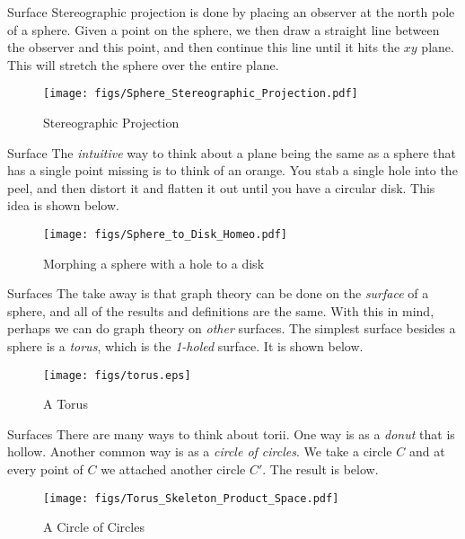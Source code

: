 \documentclass{beamer}
\begin{document}
    \begin{frame}{Surface}
        Stereographic projection is done by placing an observer at the north pole of a sphere.
        Given a point on the sphere, we then draw a straight line between the observer and
        this point, and then continue this line until it hits the $xy$ plane. This will stretch
        the sphere over the entire plane.
        \begin{figure}
            \centering
            \texttt{[image: figs/Sphere\_Stereographic\_Projection.pdf]}
            \caption{Stereographic Projection}
            \label{fig:stereo_proj}
        \end{figure}
    \end{frame}
    \begin{frame}{Surface}
        The \textit{intuitive} way to think about a plane being the same as a sphere that has a
        single point missing is to think of an orange. You stab a single hole into the peel, and
        then distort it and flatten it out until you have a circular disk. This idea is shown
        below.
        \begin{figure}
            \centering
            \texttt{[image: figs/Sphere\_to\_Disk\_Homeo.pdf]}
            \caption{Morphing a sphere with a hole to a disk}
            \label{fig:sphere_to_disk}
        \end{figure}
    \end{frame}
    \begin{frame}{Surfaces}
        The take away is that graph theory can be done on the \textit{surface} of a sphere, and
        all of the results and definitions are the same. With this in mind, perhaps we can do
        graph theory on \textit{other} surfaces. The simplest surface besides a sphere is a
        \textit{torus}, which is the \textit{1-holed} surface. It is shown below.
        \begin{figure}
            \centering
            \texttt{[image: figs/torus.eps]}
            \caption{A Torus}
            \label{fig:torus}
        \end{figure}
    \end{frame}
    \begin{frame}{Surfaces}
        There are many ways to think about torii. One way is as a \textit{donut} that is hollow.
        Another common way is as a \textit{circle of circles}. We take a circle $C$ and at every
        point of $C$ we attached another circle $C'$. The result is below.
        \begin{figure}
            \centering
            \texttt{[image: figs/Torus\_Skeleton\_Product\_Space.pdf]}
            \caption{A Circle of Circles}
            \label{fig:torus_2}
        \end{figure}
    \end{frame}
\end{document}
